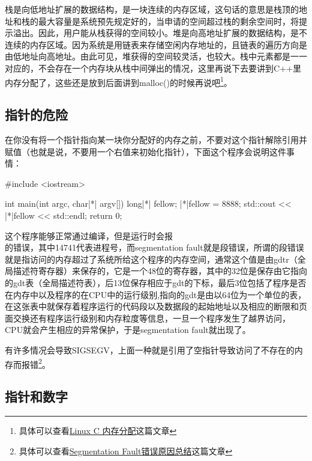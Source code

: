 栈是向低地址扩展的数据结构，是一块连续的内存区域，这句话的意思是栈顶的地址和栈的最大容量是系统预先规定好的，当申请的空间超过栈的剩余空间时，将提示溢出。因此，用户能从栈获得的空间较小。堆是向高地址扩展的数据结构，是不连续的内存区域。因为系统是用链表来存储空闲内存地址的，且链表的遍历方向是由低地址向高地址。由此可见，堆获得的空间较灵活，也较大。栈中元素都是一一对应的，不会存在一个内存块从栈中间弹出的情况，这里再说下去要讲到C++里内存分配了，这些还是放到后面讲到malloc()的时候再说吧\footnote{具体可以查看\href{https://www.cnblogs.com/zhaoosheLBJ/p/9281253.html}{Linux C 内存分配}这篇文章}。

\subsection{指针的危险}

在你没有将一个指针指向某一块你分配好的内存之前，不要对这个指针解除引用并赋值（也就是说，不要用一个右值来初始化指针），下面这个程序会说明这件事情：

\begin{cpp}
#include <iostream>

int main(int argc, char|*| argv[]) {
    long|*| fellow;
    |*|fellow = 8888;
    std::cout << |*|fellow << std::endl;
    return 0;
}
\end{cpp}

这个程序能够正常通过编译，但是运行时会报\\ 的错误，其中14741代表进程号，而segmentation fault就是段错误，所谓的段错误就是指访问的内存超过了系统所给这个程序的内存空间，通常这个值是由gdtr（全局描述符寄存器）来保存的，它是一个48位的寄存器，其中的32位是保存由它指向的gdt表（全局描述符表），后13位保存相应于gdt的下标，最后3位包括了程序是否在内存中以及程序的在CPU中的运行级别,指向的gdt是由以64位为一个单位的表，在这张表中就保存着程序运行的代码段以及数据段的起始地址以及相应的断限和页面交换还有程序运行级别和内存粒度等信息，一旦一个程序发生了越界访问，CPU就会产生相应的异常保护，于是segmentation fault就出现了。

有许多情况会导致SIGSEGV，上面一种就是引用了空指针导致访问了不存在的内存而报错\footnote{具体可以查看\href{https://www.cnblogs.com/qiumingcheng/p/11254648.html}{Segmentation Fault错误原因总结}这篇文章}。

\subsection{指针和数字}

